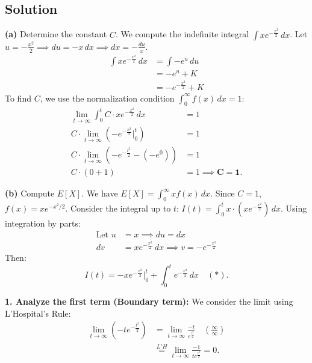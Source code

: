 \subsection*{Solution}

\textbf{(a)} Determine the constant $C$.
We compute the indefinite integral $\int x e^{-\frac{x^2}{2}} \, dx$.
Let $u = -\frac{x^2}{2} \implies du = -x \, dx \implies dx = -\frac{du}{x}$.
\begin{align*}
    \int x e^{-\frac{x^2}{2}} \, dx &= \int -e^u \, du \\
    &= -e^u + K \\
    &= -e^{-\frac{x^2}{2}} + K
\end{align*}
To find $C$, we use the normalization condition $\int_{0}^{\infty} f(x) \, dx = 1$:
\begin{align*}
    \lim_{t \to \infty} \int_{0}^{t} C \cdot x e^{-\frac{x^2}{2}} \, dx &= 1 \\
    C \cdot \lim_{t \to \infty} \left( -e^{-\frac{x^2}{2}} \Big|_{0}^{t} \right) &= 1 \\
    C \cdot \lim_{t \to \infty} \left( -e^{-\frac{t^2}{2}} - (-e^0) \right) &= 1 \\
    C \cdot (0 + 1) &= 1 \implies \mathbf{C = 1}.
\end{align*}

\vspace{1em}

\textbf{(b)} Compute $E[X]$.
We have $E[X] = \int_{0}^{\infty} x f(x) \, dx$. Since $C=1$, $f(x) = x e^{-x^2/2}$.
Consider the integral up to $t$: $I(t) = \int_{0}^{t} x \cdot (x e^{-\frac{x^2}{2}}) \, dx$.
Using integration by parts:
\begin{align*}
    \text{Let } u &= x \implies du = dx \\
    dv &= x e^{-\frac{x^2}{2}} \, dx \implies v = -e^{-\frac{x^2}{2}}
\end{align*}
Then:
\[
    I(t) = -x e^{-\frac{x^2}{2}} \Big|_{0}^{t} + \int_{0}^{t} e^{-\frac{x^2}{2}} \, dx \quad (*).
\]

\noindent \textbf{1. Analyze the first term (Boundary term):}
We consider the limit using L'Hospital's Rule:
\begin{align*}
    \lim_{t \to \infty} \left( -t e^{-\frac{t^2}{2}} \right) &= \lim_{t \to \infty} \frac{-t}{e^{\frac{t^2}{2}}} \quad \left( \frac{\infty}{\infty} \right) \\
    &\stackrel{L'H}{=} \lim_{t \to \infty} \frac{-1}{t e^{\frac{t^2}{2}}} = 0.
\end{align*}

